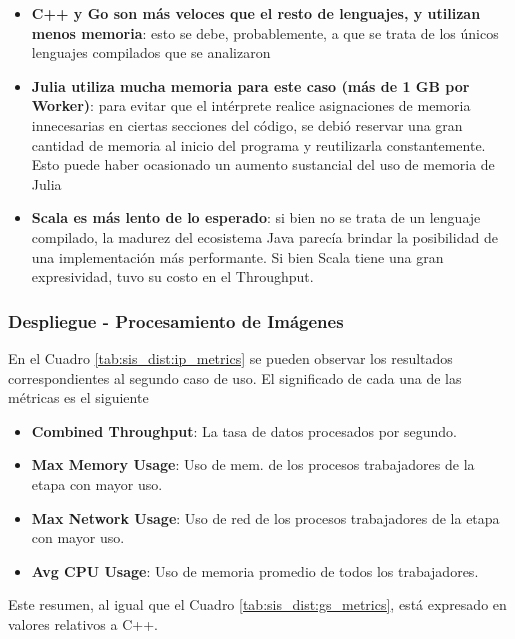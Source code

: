 \documentclass[11pt]{article}
\let\Oldsubsubsection\subsubsection
\renewcommand{\subsubsection}{\FloatBarrier\Oldsubsubsection}
\begin{document}
\begin{itemize}
    \item \textbf{C++ y Go son más veloces que el resto de lenguajes, y utilizan menos memoria}: esto se debe, probablemente, a que se trata de los únicos lenguajes compilados que se analizaron
    \item \textbf{Julia utiliza mucha memoria para este caso (más de 1 GB por Worker)}: para evitar que el intérprete realice asignaciones de memoria innecesarias en ciertas secciones del código, se debió reservar una gran cantidad de memoria al inicio del programa y reutilizarla constantemente. Esto puede haber ocasionado un aumento sustancial del uso de memoria de Julia %
    \item \textbf{Scala es más lento de lo esperado}: si bien no se trata de un lenguaje compilado, la madurez del ecosistema Java parecía brindar la posibilidad de una implementación más performante. Si bien Scala tiene una gran expresividad, tuvo su costo en el Throughput.
\end{itemize}

\subsubsection{Despliegue - Procesamiento de Imágenes}

En el Cuadro \ref{tab:sis_dist:ip_metrics} se pueden observar los resultados correspondientes al segundo caso de uso. El significado de cada una de las métricas es el siguiente

\begin{itemize} %
    \item \textbf{Combined Throughput}: La tasa de datos procesados por segundo.
    \item \textbf{Max Memory Usage}: Uso de mem. de los procesos trabajadores de la etapa con mayor uso.
    \item \textbf{Max Network Usage}: Uso de red de los procesos trabajadores de la etapa con mayor uso.
    \item \textbf{Avg CPU Usage}: Uso de memoria promedio de todos los trabajadores.
\end{itemize}

Este resumen, al igual que el Cuadro \ref{tab:sis_dist:gs_metrics}, está expresado en valores relativos a C++.
\end{document}
